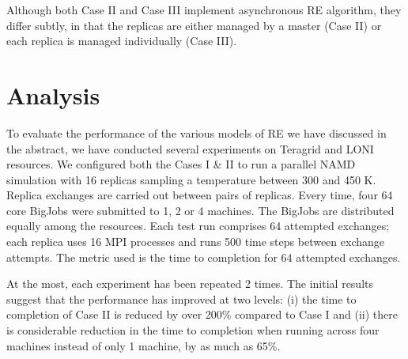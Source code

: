 \documentclass[a4paper,10pt]{article}
\newcommand{\jhanote}[1]{ {\textcolor{red} { ***shantenu: #1 }}}
\newcommand{\jhanote}[1]{}
\begin{document}
Although both Case II and Case III implement asynchronous 
RE algorithm, they differ subtly, in that the replicas
are either managed by a master (Case II) or each replica
is managed individually (Case III).

\section{Analysis}

To evaluate the performance of the various models of RE we have discussed in the abstract, we have conducted several experiments on Teragrid and LONI resources. 
We configured both the Cases I \& II to run a parallel NAMD simulation with 16 replicas sampling a temperature between 300 and 450 K. Replica exchanges are carried out between pairs of replicas. Every time, four 64 core BigJobs were submitted to 1, 2 or 4 machines. The BigJobs are distributed equally among the resources. Each test run comprises 64 attempted exchanges; each replica uses 16 MPI processes and runs 500 time steps between exchange attempts.%
The metric used is the time to completion for 64 attempted exchanges. %

At the most, each experiment has been repeated 2 times. 
The initial results suggest that the performance has improved at two levels: (i) the time to completion of Case II is reduced by over 200\% compared to Case I and (ii) there is considerable reduction in the time to completion when running across four machines instead of only 1 machine, by as much as 65\%.
\end{document}
